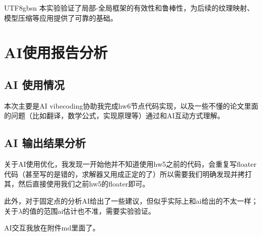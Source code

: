 \documentclass[10pt,a4paper,twocolumn]{article}
\begin{document}
\begin{CJK*}{UTF8}{gbsn}
本实验验证了局部-全局框架的有效性和鲁棒性，为后续的纹理映射、模型压缩等应用提供了可靠的基础。

\section{AI使用报告分析}
\subsection{AI 使用情况}
\par 本次主要是AI vibecoding协助我完成hw6节点代码实现，以及一些不懂的论文里面的问题（比如翻译，数学公式，实现原理等）通过和AI互动方式理解。
\subsection{AI 输出结果分析}
\par 关于AI使用优化，我发现一开始他并不知道使用hw5之前的代码，会重复写floater代码（甚至写的是错的，求解器又用成正定的了）所以需要我们明确发现并拷打其，然后直接使用我们之前hw5的floater即可。
\par 此外，对于固定点的分析AI给出了一些建议，但似乎实际上和ai给出的不太一样；关于\(\lambda\)的值的范围ai估计也不准，需要实验验证。
\par AI交互我放在附件md里面了。



\end{CJK*}
\end{document}
